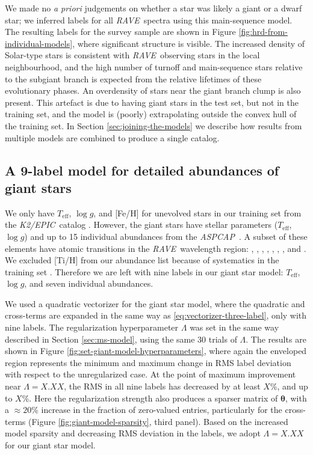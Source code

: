 \documentclass[preprint,trackchanges]{aastex}
\newcommand{\acronym}[1]{{\small{#1}}}
\newcommand{\project}[1]{\textsl{#1}}
\newcommand{\rave}{\project{\acronym{RAVE}}}
\newcommand{\aspcap}{\project{\acronym{ASPCAP}}}
\newcommand{\epic}{\project{K2/EPIC}}
\newcommand{\teff}{T_{\mathrm{eff}}}
\newcommand{\logg}{\log g}
\newcommand{\Dvector}[1]{\boldsymbol{#1}}
\newcommand{\vectheta}{\Dvector{\theta}}
\begin{document}
We made no \emph{a priori} judgements on whether a star was likely a giant
or a dwarf star; we inferred labels for all \rave\ spectra using this 
main-sequence model.  The resulting labels for the survey sample are shown
in Figure \ref{fig:hrd-from-individual-models}, where significant structure is 
visible.  The increased density of Solar-type stars is consistent with \rave\
observing stars in the local neighbourhood, and the high number of turnoff
and main-sequence stars relative to the subgiant branch is expected from 
the relative lifetimes of these evolutionary phases.  An overdensity
of stars near the giant branch clump is also present.  This artefact is due 
to having giant stars in the test set, but not in the training set, and the
model is (poorly) extrapolating outside the convex hull of the training set.
In Section \ref{sec:joining-the-models} we describe how results from multiple
models are combined to produce a single catalog.


\subsection{A 9-label model for detailed abundances of giant stars}
\label{sec:giant-abundance-model}


We only have $\teff$, $\logg$, and [Fe/H] for unevolved stars in our training
set from the \epic\ catalog \citep{Huber_2016}.  However, the giant stars 
have stellar parameters ($\teff$, $\logg$) and up to 15 individual abundances
from the \aspcap\ \citep{aspcap_paper}.  A subset of these elements have atomic
transitions in the \rave\ wavelength region: \ion{O}{1}, \ion{Mg}{1}, 
\ion{Al}{1}, \ion{Si}{1}, \ion{Ca}{2}, \ion{Ti}{1}, \ion{Fe}{1}, and .  
We excluded [Ti/H] from our abundance list because of systematics in the training
set \citep{Holtzman_2015,Hawkins_2016}.  Therefore we are left with nine labels 
in our giant star model: $\teff$, $\logg$, and seven individual abundances.  


We used a quadratic vectorizer for the giant star model, where the quadratic and
cross-terms are expanded in the same way as \ref{eq:vectorizer-three-label}, only
with nine labels.  The regularization hyperparameter $\Lambda$ was set in the same
way described in Section \ref{sec:ms-model}, using the same 30 trials of $\Lambda$.
The results are shown in Figure \ref{fig:set-giant-model-hyperparameters}, where
again the enveloped region represents the minimum and maximum change in RMS label
deviation with respect to the unregularized case.  At the point of maximum improvement 
near $\Lambda = X.XX$, the RMS in all nine labels has decreased by at least $X$\%, 
and up to $X$\%.  Here the regularization strength also produces a sparser matrix
of $\vectheta$, with a $\approx20$\% increase in the fraction of zero-valued 
entries, particularly for the cross-terms (Figure \ref{fig:giant-model-sparsity},
third panel).  Based on the increased model sparsity and decreasing RMS deviation
in the labels, we adopt $\Lambda = X.XX$ for our giant star model.
\end{document}
